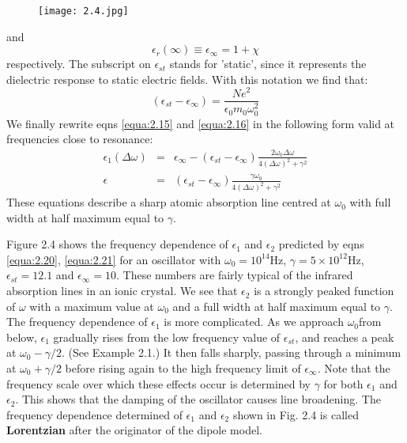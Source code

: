 \documentclass[12pt]{book}
\begin{document}
\begin{figure}[htbp]
  \texttt{[image: 2.4.jpg]}\\
  \label{fig:2.4}
\end{figure}

and
\begin{equation}\label{equa:2.18}
  \epsilon_r(\infty)\equiv\epsilon_{\infty}=1+\chi
\end{equation}
respectively. The subscript on $\epsilon_{st}$ stands for 'static', since it represents the dielectric response to static electric fields. With this notation we find that:
\begin{equation}\label{equa:2.19}
  (\epsilon_{st}-\epsilon_{\infty})=\frac{Ne^2}{\epsilon_0m_0\omega_0^2}
\end{equation}
We finally rewrite eqns \ref{equa:2.15} and \ref{equa:2.16} in the following form valid at frequencies close to resonance:
\begin{eqnarray}
  \epsilon_1(\Delta\omega) &=& \epsilon_{\infty}-(\epsilon_{st}-\epsilon_{\infty})\frac{2\omega_0\Delta\omega}{4(\Delta\omega)^2+\gamma^2}  \label{equa:2.20}\\
  \epsilon &=& (\epsilon_{st}-\epsilon_{\infty})\frac{\gamma\omega_0}{4(\Delta\omega)^2+\gamma^2} \label{equa:2.21}
\end{eqnarray}
These equations describe a sharp atomic absorption line centred at $\omega_0$ with full width at half maximum equal to $\gamma$.

Figure 2.4 shows the frequency dependence of $\epsilon_1$ and $\epsilon_2$ predicted by eqns \ref{equa:2.20}, \ref{equa:2.21} for an oscillator with $\omega_0 = 10^{14}$Hz, $\gamma = 5\times10^{12}$Hz, $\epsilon_{st}=12.1$ and $\epsilon_{\infty}=10$. These numbers are fairly typical of the infrared absorption lines in an ionic crystal. We see that $\epsilon_2$ is a strongly peaked function of $\omega$ with a maximum value at $\omega_0$ and a full width at half maximum equal to $\gamma$. The frequency dependence of $\epsilon_1$ is more complicated. As we approach $\omega_0$from below, $\epsilon_1$ gradually rises from the low frequency value of $\epsilon_{st}$, and reaches a peak at $\omega_0-\gamma/2$. (See Example 2.1.) It then falls sharply, passing through a minimum at $\omega_0+\gamma/2$ before rising again to the high frequency limit of $\epsilon_{\infty}$. Note that the frequency scale over which these effects occur is determined by $\gamma$ for both $\epsilon_1$ and $\epsilon_2$. This shows that the damping of the oscillator causes line broadening. The frequency dependence determined of $\epsilon_1$ and $\epsilon_2$ shown in Fig. 2.4 is called \textbf{Lorentzian} after the originator of the dipole model.
\end{document}
